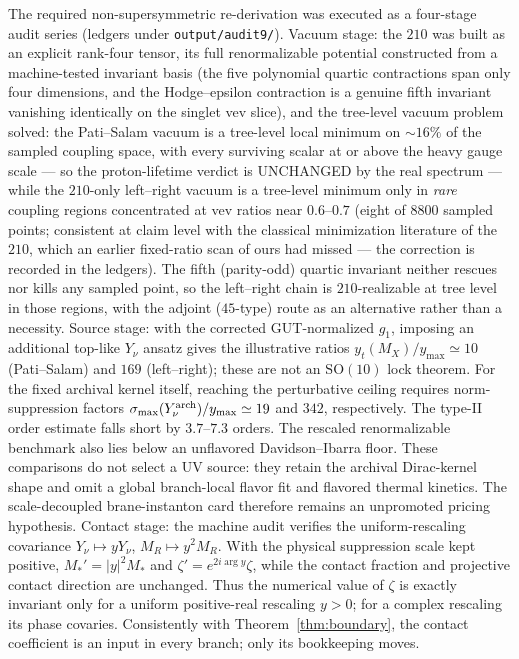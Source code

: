 \documentclass[
  aps,
  prd,
  preprint,
  nofootinbib,
  superscriptaddress,
  longbibliography
]{revtex4-2}
\newcommand{\SO}{\mathrm{SO}}
\begin{document}
\begin{description}
The required non-supersymmetric re-derivation was executed as a
four-stage audit series (ledgers under \texttt{output/audit9/}).
Vacuum stage: the \(210\) was built as an explicit rank-four tensor,
its full renormalizable potential constructed from a machine-tested
invariant basis (the five polynomial quartic contractions span only
four dimensions, and the Hodge--epsilon contraction is a genuine fifth
invariant vanishing identically on the singlet vev slice), and the
tree-level vacuum problem solved: the Pati--Salam vacuum is a
tree-level local minimum on \(\sim16\%\) of the sampled coupling
space, with every surviving scalar at or above the heavy gauge scale
--- so the proton-lifetime verdict is UNCHANGED by the real spectrum
--- while the \(210\)-only left--right vacuum is a tree-level minimum
only in \emph{rare} coupling regions concentrated at vev ratios near
\(0.6\)--\(0.7\) (eight of \(8800\) sampled points; consistent at
claim level with the classical minimization literature of the
\(210\), which an earlier fixed-ratio scan of ours had missed --- the
correction is recorded in the ledgers).  The fifth (parity-odd)
quartic invariant neither rescues nor kills any sampled point, so the
left--right chain is \(210\)-realizable at tree level in those
regions, with the adjoint (\(45\)-type) route as an alternative
rather than a necessity.  Source stage: with the corrected
GUT-normalized \(g_1\), imposing an additional top-like \(Y_\nu\) ansatz
gives the illustrative ratios \(y_t(M_X)/y_{\max}\simeq10\)
(Pati--Salam) and \(169\) (left--right); these are not an \(\SO(10)\)
lock theorem.  For the fixed archival kernel itself, reaching the
perturbative ceiling requires norm-suppression factors
\(\sigma_{\max}(Y_\nu^{\rm arch})/y_{\max}\simeq19\) and \(342\),
respectively.  The type-II order estimate falls short by
\(3.7\)--\(7.3\) orders.
The rescaled renormalizable benchmark also lies below an unflavored
Davidson--Ibarra floor.  These comparisons do not select a UV source:
they retain the archival Dirac-kernel shape and omit a global branch-local
flavor fit and flavored thermal kinetics.  The scale-decoupled
brane-instanton card therefore remains an unpromoted pricing hypothesis.
Contact stage: the machine audit verifies the uniform-rescaling covariance
\(Y_\nu\mapsto yY_\nu\), \(M_R\mapsto y^2M_R\).  With the physical
suppression scale kept positive, \(M_*' = |y|^2M_*\) and
\(\zeta'=e^{2i\arg y}\zeta\), while the contact fraction and projective
contact direction are unchanged.  Thus the numerical value of \(\zeta\)
is exactly invariant only for a uniform positive-real rescaling \(y>0\);
for a complex rescaling its phase covaries.
Consistently with Theorem~\ref{thm:boundary}, the contact coefficient
is an input in every branch; only its bookkeeping moves.


\end{description}
\end{document}

